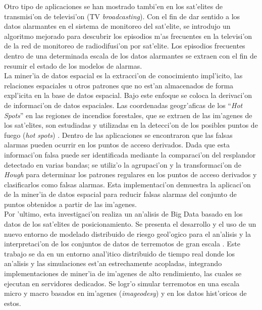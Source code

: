 Otro tipo de aplicaciones se han mostrado tambi'en en los sat'elites de transmisi'on de televisi'on \cite{li_application_2009} (TV \emph{broadcasting}). Con el fin de dar sentido a los datos alarmantes en el sistema de monitoreo del sat'elite, se introdujo un algoritmo mejorado para descubrir los episodios m'as frecuentes en la televisi'on de la red de monitoreo de radiodifusi'on por sat'elite. Los episodios frecuentes dentro de una determinada escala de los datos alarmantes se extraen con el fin de resumir el estado de los modelos de alarmas.\\

La miner'ia de datos espacial es la extracci'on de conocimiento impl'icito, las relaciones espaciales u otros patrones que no est'an almacenados de forma expl'icita en la base de datos espacial. Bajo este enfoque se coloca la derivaci'on de informaci'on de datos espaciales. Las coordenadas geogr'aficas de los ``\emph{Hot Spots}'' en las regiones de incendios forestales, que se extraen de las im'agenes de los sat'elites, son estudiadas y utilizadas en la detecci'on de los posibles puntos de fuego (\emph{hot spots}) \cite{tay_spatial_2003}. Dentro de las aplicaciones se encontraron que las falsas alarmas pueden ocurrir en los puntos de acceso derivados. Dada que esta informaci'on falsa puede ser identificada mediante la comparaci'on del resplandor detectado en varias bandas; se utiliz'o la agrupaci'on y la transformaci'on de \emph{Hough} para determinar los patrones regulares en los puntos de acceso derivados y clasificarlos como falsas alarmas. Esta implementaci'on demuestra la aplicaci'on de la miner'ia de datos espacial para reducir falsas alarmas del conjunto de puntos obtenidos a partir de las im'agenes.\\

Por 'ultimo, esta investigaci'on realiza un an'alisis de Big Data basado en los datos de los sat'elites de posicionamiento. Se presenta el desarrollo y el uso de un nuevo entorno de modelado distribuido de riesgo geol'ogico para el an'alisis y la interpretaci'on de los conjuntos de datos de terremotos de gran escala \cite{Guo2005}. Este trabajo se da en un entorno anal'itico distribuido de tiempo real donde los an'alisis y las simulaciones est'an estrechamente acopladas, integrando implementaciones de miner'ia de im'agenes de alto rendimiento, las cuales se ejecutan en servidores dedicados. Se logr'o simular terremotos en una escala micro y macro basados en im'agenes (\emph{imageodesy}) y en los datos hist'oricos de estos.

\clearpage